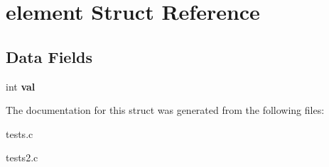 \hypertarget{structelement}{}\section{element Struct Reference}
\label{structelement}
\subsection*{Data Fields}
\begin{DoxyCompactItemize}
\item 
\hypertarget{structelement_aaecd51bd283a28cec48516cd12415606}{}int {\bfseries val}\label{structelement_aaecd51bd283a28cec48516cd12415606}

\end{DoxyCompactItemize}


The documentation for this struct was generated from the following files\+:\begin{DoxyCompactItemize}
\item 
tests.\+c\item 
tests2.\+c\end{DoxyCompactItemize}
